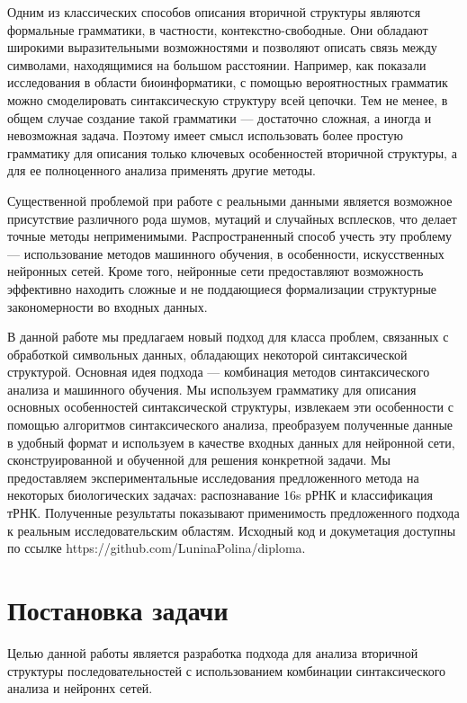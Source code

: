 \documentclass[14pt]{matmex-diploma-custom}
\begin{document}
Одним из классических способов описания вторичной структуры являются формальные грамматики, в частности, контекстно-свободные. Они обладают широкими выразительными возможностями и позволяют описать связь между символами, находящимися на большом расстоянии. Например, как показали исследования в области биоинформатики, с помощью вероятностных грамматик можно смоделировать синтаксическую структуру всей цепочки. Тем не менее, в общем случае создание такой грамматики --- достаточно сложная, а иногда и невозможная задача. Поэтому имеет смысл использовать более простую грамматику для описания только ключевых особенностей вторичной структуры, а для ее полноценного анализа применять другие методы.

Существенной проблемой при работе с реальными данными является возможное присутствие различного рода шумов, мутаций и случайных всплесков, что делает точные методы неприменимыми. Распространенный способ учесть эту проблему --- использование методов машинного обучения, в особенности, искусственных нейронных сетей. Кроме того, нейронные сети предоставляют возможность эффективно находить сложные и не поддающиеся формализации структурные закономерности во входных данных.

В данной работе мы предлагаем новый подход для класса проблем, связанных с обработкой символьных данных, обладающих некоторой синтаксической структурой. Основная идея подхода --- комбинация методов синтаксического анализа и машинного обучения. Мы используем грамматику для описания основных особенностей синтаксической структуры, извлекаем эти особенности с помощью алгоритмов синтаксического анализа, преобразуем полученные данные в удобный формат и используем в качестве входных данных для нейронной сети, сконструированной и обученной для решения конкретной задачи. Мы предоставляем экспериментальные исследования предложенного метода на некоторых биологических задачах: распознавание 16s рРНК и классификация тРНК. Полученные результаты показывают применимость предложенного подхода к реальным исследовательским областям.
Исходный код и докуметация доступны по ссылке https://github.com/LuninaPolina/diploma.

\section{Постановка задачи}
Целью данной работы является разработка подхода для анализа вторичной структуры последовательностей с использованием комбинации синтаксического анализа и нейроннх сетей.
\end{document}
